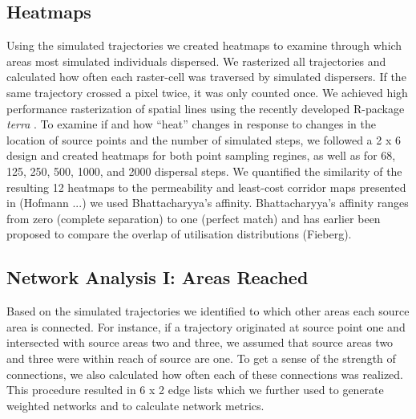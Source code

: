 \documentclass[abstract=on,10pt,a4paper,bibliography=totocnumbered]{article}
\begin{document}
\subsection{Heatmaps}
Using the simulated trajectories we created heatmaps to examine through which
areas most simulated individuals dispersed. We rasterized all trajectories and
calculated how often each raster-cell was traversed by simulated dispersers. If
the same trajectory crossed a pixel twice, it was only counted once. We achieved
high performance rasterization of spatial lines using the recently developed
R-package \textit{terra} \citep{Hijmans.2020}. To examine if and how ``heat''
changes in response to changes in the location of source points and the number
of simulated steps, we followed a 2 x 6 design and created heatmaps for both
point sampling regines, as well as for 68, 125, 250, 500, 1000, and 2000
dispersal steps. We quantified the similarity of the resulting 12 heatmaps to
the permeability and least-cost corridor maps presented in (Hofmann ...) we used
Bhattacharyya's affinity. Bhattacharyya's affinity ranges from zero (complete
separation) to one (perfect match) and has earlier been proposed to compare the
overlap of utilisation distributions (Fieberg).

\subsection{Network Analysis I: Areas Reached}
Based on the simulated trajectories we identified to which other areas each
source area is connected. For instance, if a trajectory originated at source
point one and intersected with source areas two and three, we assumed that
source areas two and three were within reach of source are one. To get a sense
of the strength of connections, we also calculated how often each of these
connections was realized. This procedure resulted in 6 x 2 edge lists which we
further used to generate weighted networks and to calculate network metrics.
\end{document}

